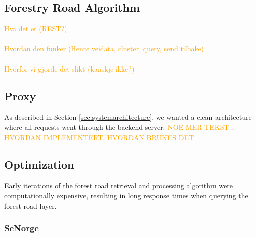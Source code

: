 \subsection{Forestry Road Algorithm}\label{subsec:server:forestroadalgorithm}

\textcolor{orange}{
Hva det er (REST?) \\ \\
Hvordan den funker (Hente veidata, cluster, query, send tilbake) \\ \\
Hvorfor vi gjorde det slikt (kanskje ikke?)
}

\subsection{Proxy}\label{subsec:server:proxy}

As described in Section \ref{sec:systemarchitecture}, we wanted a clean architecture where all requests went through the backend server. 
\textcolor{orange}{NOE MER TEKST... HVORDAN IMPLEMENTERT, HVORDAN BRUKES DET}


\subsection{Optimization}\label{subsec:server:optimization}

Early iterations of the forest road retrieval and processing algorithm were computationally expensive, resulting in long response times when querying the forest road layer.

\subsubsection{SeNorge}

